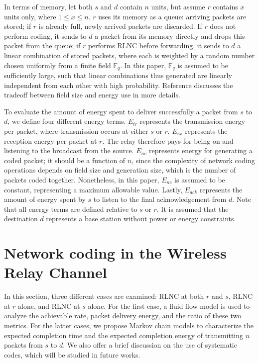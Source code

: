 \documentclass[journal, letterpaper]{IEEEtran}
\begin{document}
In terms of memory, let both $s$ and $d$ contain $n$ units, but assume $r$ contains $x$ units only, where $1\leq x \leq n$. $r$ uses its memory as a queue: arriving packets are stored; if $r$ is already full, newly arrived packets are discarded. If $r$ does not perform coding, it sends to $d$ a packet from its memory directly and drops this packet from the queue; if $r$ performs RLNC before forwarding, it sends to $d$ a linear combination of stored packets, where each is weighted by a random number chosen uniformly from a finite field $\mathbb{F}_q$. In this paper, $\mathbb{F}_q$ is assumed to be sufficiently large, such that linear combinations thus generated are linearly independent from each other with high probability. Reference \cite{angelopoulos2011energy} discusses the tradeoff between field size and energy use in more details.

To evaluate the amount of energy spent to deliver successfully a packet from $s$ to $d$, we define four different energy terms. $E_{tr}$ represents the transmission energy per packet, where transmission occurs at either $s$ or $r$. $E_{rx}$ represents the reception energy per packet at $r$. The relay therefore pays for being on and listening to the broadcast from the source. $E_{nc}$ represents energy for generating a coded packet; it should be a function of $n$, since the complexity of network coding operations depends on field size and generation size, which is the number of packets coded together. Nonetheless, in this paper, $E_{nc}$ is assumed to be constant, representing a maximum allowable value. Lastly, $E_{ack}$ represents the amount of energy spent by $s$ to listen to the final acknowledgement from $d$. Note that all energy terms are defined relative to $s$ or $r$. It is assumed that the destination $d$ represents a base station without power or energy constraints.


\section{Network coding in the Wireless Relay Channel}\label{sec:analysis}
In this section, three different cases are examined: RLNC at both $r$ and $s$, RLNC at $r$ alone, and RLNC at $s$ alone. For the first case, a fluid flow model is used to analyze the achievable rate, packet delivery energy, and the ratio of these two metrics. For the latter cases, we propose Markov chain models to characterize the expected completion time and the expected completion energy of transmitting $n$ packets from $s$ to $d$. We also offer a brief discussion on the use of systematic codes, which will be studied in future works.
\end{document}
